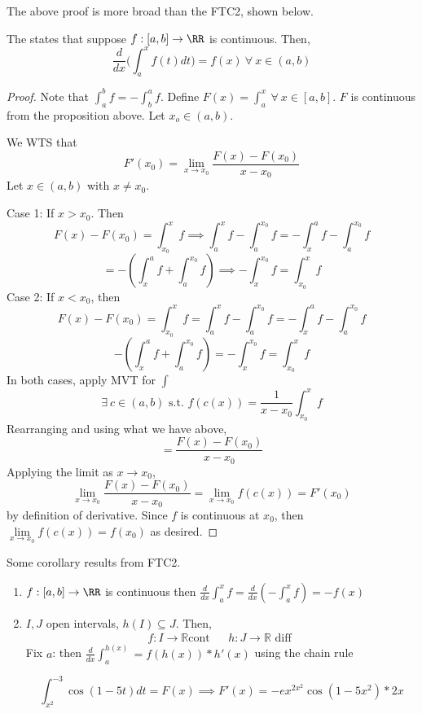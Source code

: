 \documentclass[12pt]{scrartcl}
\begin{document}
\begin{remark}
  The above proof is more broad than the FTC2, shown below.
\end{remark}

\begin{theorem}
  The  states that 
  suppose $f: [a,b] \to \RR$ is continuous. Then, 
  \[\frac{d}{dx} \Biggl(\int_a^x f(t) dt\Biggr) = f(x) \ \forall \ x \in (a,b)\]


  \begin{proof}

    \hfill

    Note that $\int_a^b f = -\int_b^a f$. Define $F(x) = \int_a^x \ \forall \ x \in [a,b]$. 
    $F$ is continuous from the proposition above. Let $x_o \in (a,b)$. 

    We WTS that
    \[F'(x_0) = \lim_{x\to x_0}\frac{F(x) - F(x_0)}{x - x_0}\]
    Let $x \in (a,b)$ with $x \neq x_0$.

    Case 1: If $x > x_0$. Then 
    \[F(x) - F(x_0) = \int_{x_0}^x f \implies \int_a^x f - \int_a^{x_0} f = -\int_x^a f - \int_a^{x_0} f\]
    \[= -(\int_x^a f + \int_a^{x_0} f) \implies -\int_x^{x_0} f = \int_{x_0}^x f\]
    Case 2: If $x < x_0$, then 
    \[F(x) - F(x_0) = \int_{x_0}^x f = \int_a^x f - \int_a^{x_0} f = -\int_x^a f - \int_a^{x_0} f\]
    \[- (\int_x^a f + \int_a^{x_0} f) = -\int_x^{x_0}f = \int_{x_0}^x f\]
    In both cases, apply MVT for $\int$
    \[\exists \ c \in (a,b) \text{ s.t. } f(c(x)) = \frac{1}{x-x_0}\int_{x_0}^x f\]
    Rearranging and using what we have above,
    \[= \frac{F(x) - F(x_0)}{x - x_0}\]
    Applying the limit as $x\to x_0$,
    \[\lim_{x\to x_0}\frac{F(x) - F(x_0)}{x - x_0} = \lim_{x\to x_0} f(c(x)) = F'(x_0)\]
    by definition of derivative. Since $f$ is continuous at $x_0$, then $\underset{x\to x_0}{\lim} {f(c(x))} = f(x_0)$
    as desired.
  \end{proof}
\end{theorem}

\begin{corollary}
  Some corollary results from FTC2. 

  \begin{enumerate}
    \item $f: [a,b] \to\RR$ is continuous then $\frac{d}{dx} \int_a^x f= \frac{d}{dx}(-\int_a^x f) = -f(x)$
    \item $I, J$ open intervals, $h(I) \subseteq J$. Then,
    \begin{align*}
      f: I \to \mathbb{R} \text{cont} && h: J \to \mathbb{R} \text{ diff }
    \end{align*}
    Fix $a$: then $\frac{d}{dx}\int_a^{h(x)} = f(h(x)) * h'(x)$ using the chain rule

    \[\int_{x^2}^{-3} \cos(1-5t)dt = F(x) \implies F'(x) = -ex^{2x^2}\cos(1-5x^2) * 2x\]
  \end{enumerate}
\end{corollary}
\end{document}
